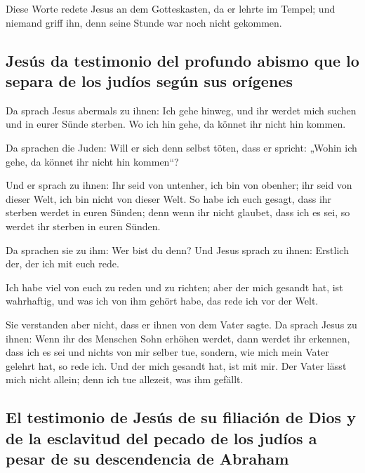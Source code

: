  Diese Worte redete Jesus an dem Gotteskasten, da er
lehrte im Tempel; und niemand griff ihn, denn seine Stunde war noch
nicht gekommen.

\hypertarget{jesuxfas-da-testimonio-del-profundo-abismo-que-lo-separa-de-los-juduxedos-seguxfan-sus-oruxedgenes}{%
\subsection{Jesús da testimonio del profundo abismo que lo separa de los
judíos según sus
orígenes}\label{jesuxfas-da-testimonio-del-profundo-abismo-que-lo-separa-de-los-juduxedos-seguxfan-sus-oruxedgenes}}

 Da sprach Jesus abermals zu ihnen: Ich gehe hinweg, und
ihr werdet mich suchen und in eurer Sünde sterben. Wo ich hin gehe, da
könnet ihr nicht hin kommen.

 Da sprachen die Juden: Will er sich denn selbst töten,
dass er spricht: „Wohin ich gehe, da könnet ihr nicht hin kommen``?

 Und er sprach zu ihnen: Ihr seid von untenher, ich bin
von obenher; ihr seid von dieser Welt, ich bin nicht von dieser Welt.
 So habe ich euch gesagt, dass ihr sterben werdet in
euren Sünden; denn wenn ihr nicht glaubet, dass ich es sei, so werdet
ihr sterben in euren Sünden.

 Da sprachen sie zu ihm: Wer bist du denn? Und Jesus
sprach zu ihnen: Erstlich der, der ich mit euch rede.

 Ich habe viel von euch zu reden und zu richten; aber der
mich gesandt hat, ist wahrhaftig, und was ich von ihm gehört habe, das
rede ich vor der Welt.

 Sie verstanden aber nicht, dass er ihnen von dem Vater
sagte.  Da sprach Jesus zu ihnen: Wenn ihr des Menschen
Sohn erhöhen werdet, dann werdet ihr erkennen, dass ich es sei und
nichts von mir selber tue, sondern, wie mich mein Vater gelehrt hat, so
rede ich.  Und der mich gesandt hat, ist mit mir. Der
Vater lässt mich nicht allein; denn ich tue allezeit, was ihm gefällt.

\hypertarget{el-testimonio-de-jesuxfas-de-su-filiaciuxf3n-de-dios-y-de-la-esclavitud-del-pecado-de-los-juduxedos-a-pesar-de-su-descendencia-de-abraham}{%
\subsection{El testimonio de Jesús de su filiación de Dios y de la
esclavitud del pecado de los judíos a pesar de su descendencia de
Abraham}\label{el-testimonio-de-jesuxfas-de-su-filiaciuxf3n-de-dios-y-de-la-esclavitud-del-pecado-de-los-juduxedos-a-pesar-de-su-descendencia-de-abraham}}

